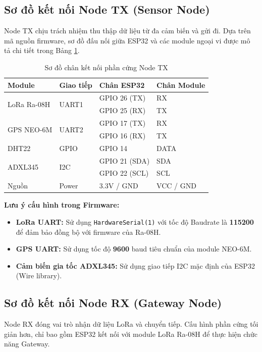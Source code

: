\subsection{Sơ đồ kết nối Node TX (Sensor Node)}
Node TX chịu trách nhiệm thu thập dữ liệu từ đa cảm biến và gửi đi. Dựa trên mã nguồn firmware, sơ đồ đấu nối giữa ESP32 và các module ngoại vi được mô tả chi tiết trong Bảng \ref{tab:wiring_tx}.

\begin{table}[h]
    \centering
    \begin{tabular}{|p{3cm}|p{2.5cm}|p{3cm}|p{4cm}|}
    \hline
    \textbf{Module} & \textbf{Giao tiếp} & \textbf{Chân ESP32} & \textbf{Chân Module} \\ \hline
    \multirow{2}{*}{LoRa Ra-08H} & \multirow{2}{*}{UART1} & GPIO 26 (TX) & RX \\ \cline{3-4} 
     & & GPIO 25 (RX) & TX \\ \hline
    \multirow{2}{*}{GPS NEO-6M} & \multirow{2}{*}{UART2} & GPIO 17 (TX) & RX \\ \cline{3-4} 
     & & GPIO 16 (RX) & TX \\ \hline
    DHT22 & GPIO & GPIO 14 & DATA \\ \hline
    \multirow{2}{*}{ADXL345} & \multirow{2}{*}{I2C} & GPIO 21 (SDA) & SDA \\ \cline{3-4} 
     & & GPIO 22 (SCL) & SCL \\ \hline
    Nguồn & Power & 3.3V / GND & VCC / GND \\ \hline
    \end{tabular}
    \caption{Sơ đồ chân kết nối phần cứng Node TX}
    \label{tab:wiring_tx}
\end{table}



\textbf{Lưu ý cấu hình trong Firmware:}
\begin{itemize}
    \item \textbf{LoRa UART:} Sử dụng \texttt{HardwareSerial(1)} với tốc độ Baudrate là \textbf{115200} để đảm bảo đồng bộ với firmware của Ra-08H.
    \item \textbf{GPS UART:} Sử dụng tốc độ \textbf{9600} baud tiêu chuẩn của module NEO-6M.
    \item \textbf{Cảm biến gia tốc ADXL345:} Sử dụng giao tiếp I2C mặc định của ESP32 (Wire library).
\end{itemize}

\subsection{Sơ đồ kết nối Node RX (Gateway Node)}
Node RX đóng vai trò nhận dữ liệu LoRa và chuyển tiếp. Cấu hình phần cứng tối giản hơn, chỉ bao gồm ESP32 kết nối với module LoRa Ra-08H để thực hiện chức năng Gateway.

